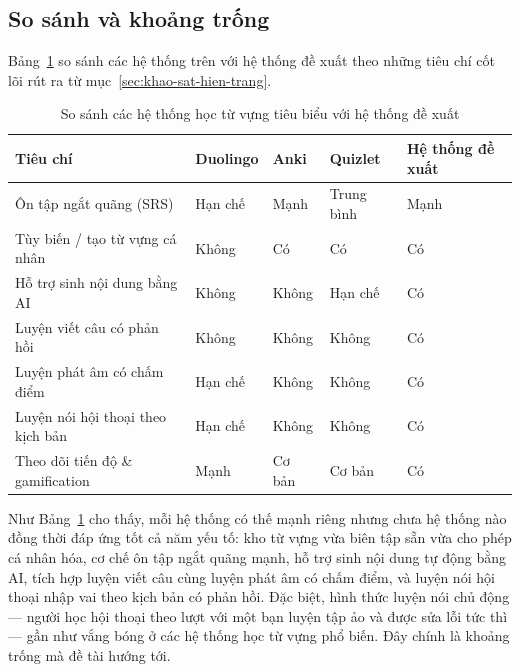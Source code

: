 \subsection{So sánh và khoảng trống}

Bảng~\ref{tab:so-sanh-he-thong} so sánh các hệ thống trên với hệ thống đề
xuất theo những tiêu chí cốt lõi rút ra từ mục~\ref{sec:khao-sat-hien-trang}.

\begin{table}[h]
  \centering
  \small
  \renewcommand{\arraystretch}{1.3}
  \begin{tabular}{|p{4.1cm}|p{2.0cm}|p{1.7cm}|p{1.9cm}|p{2.3cm}|}
    \hline
    \textbf{Tiêu chí} & \textbf{Duolingo} & \textbf{Anki} & \textbf{Quizlet} & \textbf{Hệ thống đề xuất} \\
    \hline
    Ôn tập ngắt quãng (SRS)          & Hạn chế & Mạnh   & Trung bình & Mạnh \\
    \hline
    Tùy biến / tạo từ vựng cá nhân   & Không   & Có     & Có         & Có \\
    \hline
    Hỗ trợ sinh nội dung bằng AI     & Không   & Không  & Hạn chế    & Có \\
    \hline
    Luyện viết câu có phản hồi       & Không   & Không  & Không      & Có \\
    \hline
    Luyện phát âm có chấm điểm       & Hạn chế & Không  & Không      & Có \\
    \hline
    Luyện nói hội thoại theo kịch bản & Hạn chế & Không  & Không      & Có \\
    \hline
    Theo dõi tiến độ \& gamification & Mạnh    & Cơ bản & Cơ bản     & Có \\
    \hline
  \end{tabular}
  \caption{So sánh các hệ thống học từ vựng tiêu biểu với hệ thống đề xuất}
  \label{tab:so-sanh-he-thong}
\end{table}

Như Bảng~\ref{tab:so-sanh-he-thong} cho thấy, mỗi hệ thống có thế mạnh
riêng nhưng chưa hệ thống nào đồng thời đáp ứng tốt cả năm yếu tố: kho từ
vựng vừa biên tập sẵn vừa cho phép cá nhân hóa, cơ chế ôn tập ngắt quãng
mạnh, hỗ trợ sinh nội dung tự động bằng AI, tích hợp luyện viết câu cùng
luyện phát âm có chấm điểm, và luyện nói hội thoại nhập vai theo kịch bản có
phản hồi. Đặc biệt, hình thức luyện nói chủ động --- người học hội thoại theo
lượt với một bạn luyện tập ảo và được sửa lỗi tức thì --- gần như vắng bóng ở
các hệ thống học từ vựng phổ biến. Đây chính là khoảng trống mà đề tài hướng
tới.

